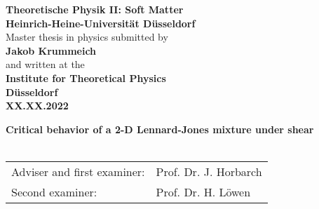\documentclass[DIV=9,11pt,BCOR=5mm,twoside=semi,abstract]{scrreprt}
\begin{document}
	

\begin{titlepage}
	\centering
	\textbf{\Large Theoretische Physik II: Soft Matter\\}
	\textbf{\Large Heinrich-Heine-Universität Düsseldorf\\}
	\vspace{12 cm}
	Master thesis in physics submitted by\\
	\vspace{4mm}
	\textbf{\large Jakob Krummeich\\}
	\vspace{4mm}
	and written at the\\
	\vspace{4mm}
	\textbf{Institute for Theoretical Physics\\}
	\vspace{4mm}
	\textbf{Düsseldorf\\}
	\vspace{4mm}
	\textbf{XX.XX.2022}
	
	\cleardoubleoddpage
	\thispagestyle{empty}
	\centering
	\textbf{\huge Critical behavior of a 2-D Lennard-Jones mixture under shear \\}
	\vspace{4mm}
	\textbf{\huge \\}
	
	\vspace{12cm}
	
	\begin{tabular}{ll}
		Adviser and first examiner: & Prof. Dr. J. Horbarch\\
		\rule{0pt}{4ex}
		Second examiner: & Prof. Dr. H. Löwen
	\end{tabular}
	
	
\end{titlepage}

\end{document}
